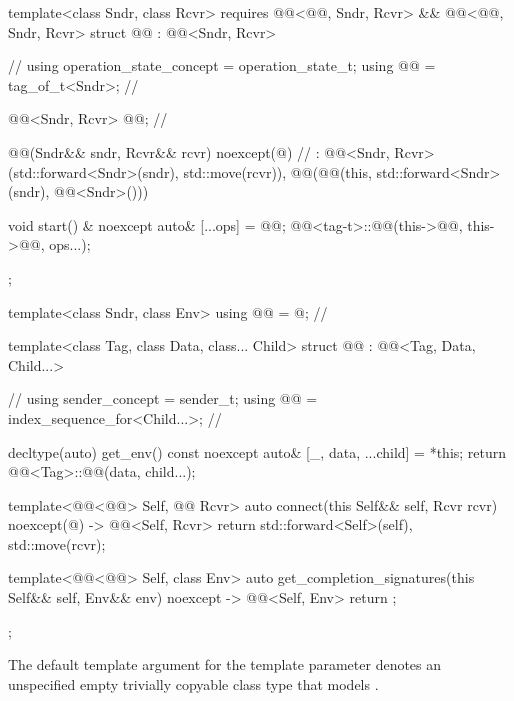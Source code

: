 \begin{codeblock}
{  template<class Sndr, class Rcvr>
    requires @@<@@, Sndr, Rcvr> &&
             @@<@@, Sndr, Rcvr>
  struct @@ : @@<Sndr, Rcvr> {                // \expos
    using operation_state_concept = operation_state_t;
    using @@ = tag_of_t<Sndr>;                               // \expos

    @@<Sndr, Rcvr> @@;              // \expos

    @@(Sndr&& sndr, Rcvr&& rcvr) noexcept(@\seebelow@)  // \expos
      : @@<Sndr, Rcvr>(std::forward<Sndr>(sndr), std::move(rcvr)),
        @@(@@(this, std::forward<Sndr>(sndr), @@<Sndr>()))
    {}

    void start() & noexcept {
      auto& [...ops] = @@;
      @@<tag-t>::@@(this->@@, this->@@, ops...);
    }
  };

  template<class Sndr, class Env>
  using @@ = @\seebelow@;                   // \expos

  template<class Tag, class Data, class... Child>
  struct @@ : @@<Tag, Data, Child...> {    // \expos
    using sender_concept = sender_t;
    using @@ = index_sequence_for<Child...>;       // \expos

    decltype(auto) get_env() const noexcept {
      auto& [_, data, ...child] = *this;
      return @@<Tag>::@@(data, child...);
    }

    template<@@<@@> Self, @@ Rcvr>
    auto connect(this Self&& self, Rcvr rcvr) noexcept(@\seebelow@)
      -> @@<Self, Rcvr> {
      return {std::forward<Self>(self), std::move(rcvr)};
    }

    template<@@<@@> Self, class Env>
    auto get_completion_signatures(this Self&& self, Env&& env) noexcept
      -> @@<Self, Env> {
      return {};
    }
  };
}
\end{codeblock}

\pnum
The default template argument for the  template parameter
denotes an unspecified empty trivially copyable class type
that models .

